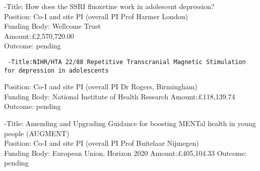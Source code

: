 \documentclass[
]{article}
\begin{document}
-Title: How does the SSRI fluoxetine work in adolescent depression?\\
Position: Co-I and site PI (overall PI Prof Harmer London)\\
Funding Body: Wellcome Trust\\
Amount:£2,570,720.00\\
Outcome: pending

\begin{verbatim}
 -Title:NIHR/HTA 22/88 Repetitive Transcranial Magnetic Stimulation for depression in adolescents 
\end{verbatim}

Position: Co-I and site PI (overall PI Dr Rogers, Birmingham)\\
Funding Body: National Institute of Health Research Amount:£118,139.74
Outcome: pending

-Title: Amending and Upgrading Guidance for boosting MENTal health in
young people (AUGMENT)\\
Position: Co-I and site PI (overall PI Prof Buitelaar Nijmegen)\\
Funding Body: European Union, Horizon 2020 Amount:£405,104.33 Outcome:
pending
\end{document}
